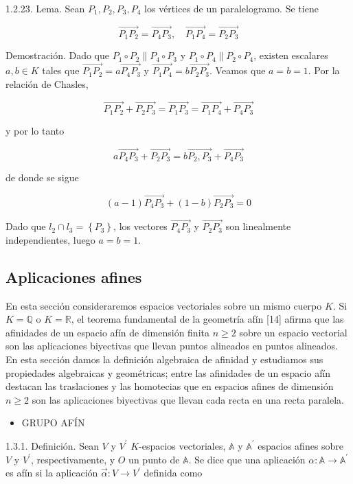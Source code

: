 \documentclass[12pt, a4paper, ones, notitlepage, openany,titlepage]{article}
\begin{document}
1.2.23. Lema. Sean $P_{1}, P_{2}, P_{3}, P_{4}$ los vértices de un paralelogramo. Se tiene

$$
\overrightarrow{P_{1} P_{2}}=\overrightarrow{P_{4} P_{3}}, \quad \overrightarrow{P_{1} P_{4}}=\overrightarrow{P_{2} P_{3}}
$$

Demostración. Dado que $P_{1} \circ P_{2} \| P_{4} \circ P_{3}$ y $P_{1} \circ P_{4} \| P_{2} \circ P_{4}$, existen escalares $a, b \in K$ tales que $\overrightarrow{P_{1} P_{2}}=a \overrightarrow{P_{4} P_{3}}$ y $\overrightarrow{P_{1} P_{4}}=b \overrightarrow{P_{2} P_{3}}$. Veamos que $a=b=1$. Por la relación de Chasles,

$$
\overrightarrow{P_{1} P_{2}}+\overrightarrow{P_{2} P_{3}}=\overrightarrow{P_{1} P_{3}}=\overrightarrow{P_{1} P_{4}}+\overrightarrow{P_{4} P_{3}}
$$

y por lo tanto

$$
a \overrightarrow{P_{4} P_{3}}+\overrightarrow{P_{2} P_{3}}=b \overrightarrow{P_{2}, P_{3}}+\overrightarrow{P_{4} P_{3}}
$$

de donde se sigue

$$
(a-1) \overrightarrow{P_{4} P_{3}}+(1-b) \overrightarrow{P_{2} P_{3}}=0
$$

Dado que $l_{2} \cap l_{3}=\left\{P_{3}\right\}$, los vectores $\overrightarrow{P_{4} P_{3}}$ y $\overrightarrow{P_{2} P_{3}}$ son linealmente independientes, luego $a=b=1$.

\subsection{Aplicaciones afines}
En esta sección consideraremos espacios vectoriales sobre un mismo cuerpo $K$. Si $K=\mathbb{Q}$ o $K=\mathbb{R}$, el teorema fundamental de la geometría afín [14] afirma que las afinidades de un espacio afín de dimensión finita $n \geq 2$ sobre un espacio vectorial son las aplicaciones biyectivas que llevan puntos alineados en puntos alineados. En esta sección damos la definición algebraica de afinidad y estudiamos sus propiedades algebraicas y geométricas; entre las afinidades de un espacio afín destacan las traslaciones y las homotecias que en espacios afines de dimensión $n \geq 2$ son las aplicaciones biyectivas que llevan cada recta en una recta paralela.

\begin{itemize}
  \item GRUPO AFÍN
\end{itemize}

1.3.1. Definición. Sean $V$ y $V^{\prime}$ $K$-espacios vectoriales, $\mathbb{A}$ y $\mathbb{A}^{\prime}$ espacios afines sobre $V$ y $V^{\prime}$, respectivamente, y $O$ un punto de $\mathbb{A}$. Se dice que una aplicación $\alpha: \mathbb{A} \rightarrow \mathbb{A}^{\prime}$ es afín si la aplicación $\vec{\alpha}: V \rightarrow V^{\prime}$ definida como
\end{document}
